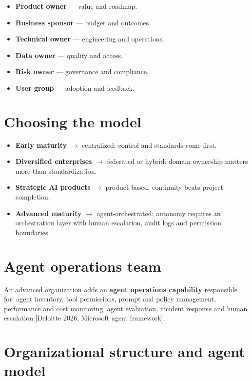 \begin{itemize}
  \item \textbf{Product owner} — value and roadmap.
  \item \textbf{Business sponsor} — budget and outcomes.
  \item \textbf{Technical owner} — engineering and operations.
  \item \textbf{Data owner} — quality and access.
  \item \textbf{Risk owner} — governance and compliance.
  \item \textbf{User group} — adoption and feedback.
\end{itemize}

\section{Choosing the model}

\begin{itemize}
  \item \textbf{Early maturity} $\rightarrow$ centralized: control and
        standards come first.
  \item \textbf{Diversified enterprises} $\rightarrow$ federated or hybrid:
        domain ownership matters more than standardization.
  \item \textbf{Strategic AI products} $\rightarrow$ product-based: continuity
        beats project completion.
  \item \textbf{Advanced maturity} $\rightarrow$ agent-orchestrated: autonomy
        requires an orchestration layer with human escalation, audit logs and
        permission boundaries.
\end{itemize}

\section{Agent operations team}

An advanced organization adds an \textbf{agent operations capability}
responsible for: agent inventory, tool permissions, prompt and policy
management, performance and cost monitoring, agent evaluation, incident
response and human escalation [Deloitte 2026; Microsoft agent framework].

\section{Organizational structure and agent model}

